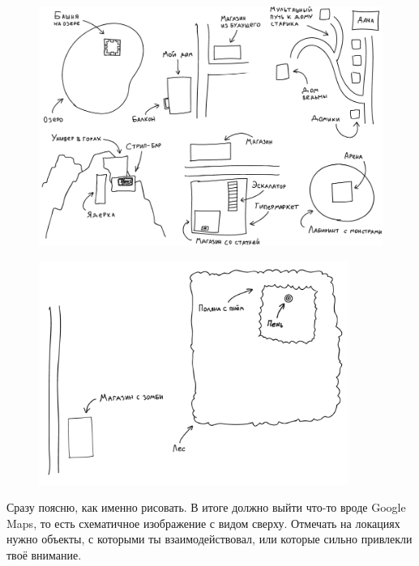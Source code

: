 \documentclass[a4paper,14pt,oneside]{memoir}
\begin{document}
\begin{figure}[h]
\begin{center}
\includegraphics[width=\textwidth]{ris21}
\end{center}
\caption{}
\label{primer1 }
\end{figure}	

\medskip

\begin{figure}[h!]
\begin{center}
\includegraphics[width=0.9\textwidth]{ris22}
\end{center}
\caption{}
\label{primer2}
\end{figure}

Сразу поясню, как именно рисовать. В итоге должно выйти что-то вроде Google Maps, то есть схематичное изображение с видом сверху. Отмечать на локациях нужно объекты, с которыми ты взаимодействовал, или которые сильно привлекли твоё внимание.
 
\end{document}
